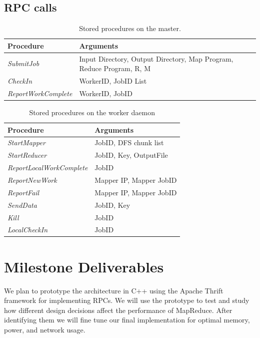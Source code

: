 \documentclass[10pt,letter,final,article,twocolumn]{article} %
\newcommand{\rpc}[1]{\emph{#1}}
\begin{document}
\subsection{RPC calls}

\begin{table}[htdp]
\caption{Stored procedures on the master.}
\begin{center}
\begin{tabular}{|l|l|}\hline
\textbf{Procedure} & \textbf{Arguments}\\\hline
\rpc{SubmitJob} & Input Directory, Output Directory, Map Program, Reduce Program, R, M\\
\rpc{CheckIn} & WorkerID, JobID List\\
\rpc{ReportWorkComplete} & WorkerID, JobID\\\hline
\end{tabular}
\end{center}
\label{default}
\end{table}%

\begin{table}[htdp]
\caption{Stored procedures on the worker daemon}
\begin{center}
\begin{tabular}{|l|l|}\hline
\textbf{Procedure} & \textbf{Arguments}\\\hline
\rpc{StartMapper} & JobID, DFS chunk list \\
\rpc{StartReducer} & JobID, Key, OutputFile \\
\rpc{ReportLocalWorkComplete} & JobID\\
\rpc{ReportNewWork} & Mapper IP, Mapper JobID\\
\rpc{ReportFail} & Mapper IP, Mapper JobID\\
\rpc{SendData} & JobID, Key\\
\rpc{Kill} & JobID\\
\rpc{LocalCheckIn} & JobID\\\hline
\end{tabular}
\end{center}
\label{default}
\end{table}%



\section{Milestone Deliverables}
We plan to prototype the architecture in C++ using the Apache Thrift framework for implementing RPCs. We will use the prototype to test and study how different design decisions affect the performance of MapReduce. After identifying them we will fine tune our final implementation for optimal memory, power, and network usage.




\end{document}
